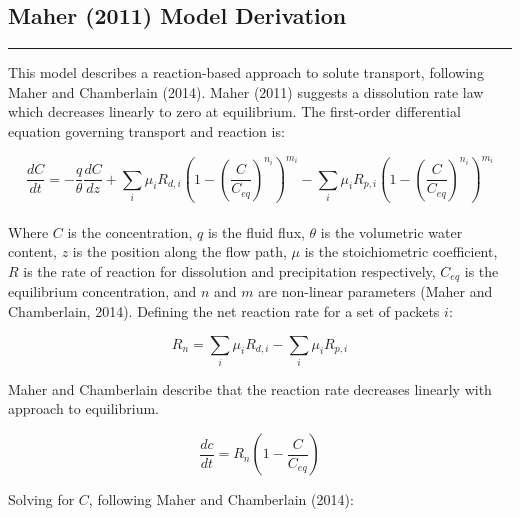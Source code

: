 \FloatBarrier

\newpage
\begin{tcolorbox}[
    colback=white,
    colframe=white,
    sharp corners,
    boxrule=0pt,
    breakable,
    width=\dimexpr\textwidth+1cm\relax,
    enlarge left by=-0.5cm,
    leftrule=0mm, rightrule=0mm, toprule=0mm, bottomrule=0mm
]


\subsection*{Maher (2011) Model Derivation}
\vspace{-5mm}
{\footnotesize

\noindent\rule{\textwidth}{0.5pt}

This model describes a reaction-based approach to solute transport, following Maher and Chamberlain (2014). Maher (2011) suggests a dissolution rate law which decreases linearly to zero at equilibrium. The first-order differential equation governing transport and reaction is:

\begin{equation}
    \frac{dC}{dt} = -\frac{q}{\theta} \frac{dC}{dz} + \sum_i \mu_i R_{d,i} \left( 1 - \left( \frac{C}{C_{eq}} \right)^{n_i} \right)^{m_i} - \sum_i \mu_i R_{p,i} \left( 1 - \left( \frac{C}{C_{eq}} \right)^{n_i} \right)^{m_i}
\end{equation}\\

Where \( C \) is the concentration, \( q \) is the fluid flux, \( \theta \) is the volumetric water content, \( z \) is the position along the flow path, \( \mu \) is the stoichiometric coefficient, \( R \) is the rate of reaction for dissolution and precipitation respectively, \( C_{eq} \) is the equilibrium concentration, and \( n \) and \( m \) are non-linear parameters (Maher and Chamberlain, 2014). Defining the net reaction rate for a set of packets $i$:

\begin{equation}
    R_n = \sum_i \mu_i R_{d,i} - \sum_i \mu_i R_{p,i}
\end{equation}

Maher and Chamberlain describe that the reaction rate decreases linearly with approach to equilibrium.

\begin{equation}
    \frac{dc}{dt} = R_n \left( 1 - \frac{C}{C_{eq}} \right)
\end{equation}

Solving for \( C \), following Maher and Chamberlain (2014):

}
\end{tcolorbox}

